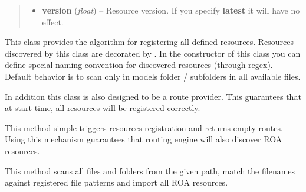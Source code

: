 \documentclass[letterpaper,10pt,english]{sphinxmanual}
\begin{document}
\begin{fulllineitems}
\begin{fulllineitems}
\begin{quote}
\begin{description}
\begin{itemize}
\item {} 
\textbf{version} (\emph{float}) -- Resource version. If you specify \textbf{latest} it will have no effect.

\end{itemize}

\end{description}\end{quote}

\end{fulllineitems}


\end{fulllineitems}


\begin{fulllineitems}
\label{features/roa/technical_summary:fantastico.roa.resources_registrator.ResourcesRegistrator}
This class provides the algorithm for registering all defined resources. Resources discovered by this class are decorated
by {\hyperref[features/roa/technical_summary:fantastico.roa.resource_decorator.Resource]{}}. In the constructor of this class you can define special naming
convention for discovered resources (through regex). Default behavior is to scan only in models folder / subfolders in all
available files.

In addition this class is also designed to be a route provider. This guarantees that at start time, all resources will be
registered correctly.

\begin{fulllineitems}
\label{features/roa/technical_summary:fantastico.roa.resources_registrator.ResourcesRegistrator.load_routes}
This method simple triggers resources registration and returns empty routes. Using this mechanism guarantees that
routing engine will also discover ROA resources.

\end{fulllineitems}


\begin{fulllineitems}
\label{features/roa/technical_summary:fantastico.roa.resources_registrator.ResourcesRegistrator.register_resources}
This method scans all files and folders from the given path, match the filenames against registered file patterns
and import all ROA resources.

\end{fulllineitems}


\end{fulllineitems}
\end{document}
